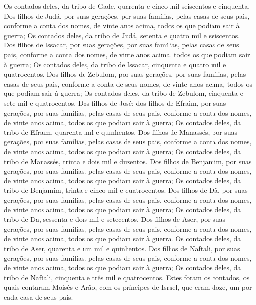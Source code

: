{  Os contados deles, da tribo de Gade, quarenta e cinco mil seiscentos e cinquenta.
  Dos filhos de Judá, por suas gerações, por suas famílias, pelas casas de seus pais, conforme a conta dos nomes, de vinte anos acima, todos os que podiam sair à guerra;
  Os contados deles, da tribo de Judá, setenta e quatro mil e seiscentos.
  Dos filhos de Issacar, por suas gerações, por suas famílias, pelas casas de seus pais, conforme a conta dos nomes, de vinte anos acima, todos os que podiam sair à guerra;
  Os contados deles, da tribo de Issacar, cinquenta e quatro mil e quatrocentos.
  Dos filhos de Zebulom, por suas gerações, por suas famílias, pelas casas de seus pais, conforme a conta de seus nomes, de vinte anos acima, todos os que podiam sair à guerra;
  Os contados deles, da tribo de Zebulom, cinquenta e sete mil e quatrocentos.
  Dos filhos de José: dos filhos de Efraim, por suas gerações, por suas famílias, pelas casas de seus pais, conforme a conta dos nomes, de vinte anos acima, todos os que podiam sair à guerra;
  Os contados deles, da tribo de Efraim, quarenta mil e quinhentos.
  Dos filhos de Manassés, por suas gerações, por suas famílias, pelas casas de seus pais, conforme a conta dos nomes, de vinte anos acima, todos os que podiam sair à guerra;
  Os contados deles, da tribo de Manassés, trinta e dois mil e duzentos.
  Dos filhos de Benjamim, por suas gerações, por suas famílias, pelas casas de seus pais, conforme a conta dos nomes, de vinte anos acima, todos os que podiam sair à guerra;
  Os contados deles, da tribo de Benjamim, trinta e cinco mil e quatrocentos.
  Dos filhos de Dã, por suas gerações, por suas famílias, pelas casas de seus pais, conforme a conta dos nomes, de vinte anos acima, todos os que podiam sair à guerra;
  Os contados deles, da tribo de Dã, sessenta e dois mil e setecentos.
  Dos filhos de Aser, por suas gerações, por suas famílias, pelas casas de seus pais, conforme a conta dos nomes, de vinte anos acima, todos os que podiam sair à guerra.
  Os contados deles, da tribo de Aser, quarenta e um mil e quinhentos.
  Dos filhos de Naftali, por suas gerações, por suas famílias, pelas casas de seus pais, conforme a conta dos nomes, de vinte anos acima, todos os que podiam sair à guerra;
  Os contados deles, da tribo de Naftali, cinquenta e três mil e quatrocentos.
  Estes foram os contados, os quais contaram Moisés e Arão, com os príncipes de Israel, que eram doze, um por cada casa de seus pais.
}
